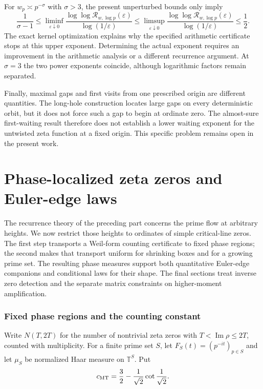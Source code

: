 \documentclass[11pt,letterpaper]{article}
\theoremstyle{definition}
\theoremstyle{remark}
\newcommand{\T}{\mathbb T}
\newcommand{\eps}{\varepsilon}
\renewcommand{\Im}{\operatorname{Im}}
\newcommand{\1}{\mathbf 1}
\begin{document}
For $w_p\asymp p^{-\sigma}$ with $\sigma>3$, the present
unperturbed bounds only imply
\[
 \frac1{\sigma-1}\le
 \liminf_{\eps\downarrow0}
 \frac{\log\log\mathcal R_{w,\log p}(\eps)}{\log(1/\eps)}
 \le
 \limsup_{\eps\downarrow0}
 \frac{\log\log\mathcal R_{w,\log p}(\eps)}{\log(1/\eps)}
 \le\frac12.
\]
The exact kernel optimization explains why the specified arithmetic
certificate stops at this upper exponent. Determining the actual
exponent requires an improvement in the arithmetic analysis or a
different recurrence argument. At $\sigma=3$ the two power exponents
coincide, although logarithmic factors remain separated.

Finally, maximal gaps and first visits from one prescribed origin are
different quantities. The long-hole construction locates large gaps
on every deterministic orbit, but it does not force such a gap to
begin at ordinate zero. The almost-sure first-waiting result therefore
does not establish a lower waiting exponent for the untwisted zeta
function at a fixed origin. This specific problem remains open in the
present work.


\clearpage

\part{Phase-localized zeta zeros and Euler-edge laws}
\label{part:zeta-localization}The recurrence theory of the preceding part concerns the prime flow
at arbitrary heights. We now restrict those heights to ordinates of
simple critical-line zeros. The first step transports a Weil-form
counting certificate to fixed phase regions; the second makes that
transport uniform for shrinking boxes and for a growing prime set.
The resulting phase measures support both quantitative Euler-edge
companions and conditional laws for their shape. The final sections
treat inverse zero detection and the separate matrix constraints on
higher-moment amplification.

\section{Fixed phase regions and the counting constant}

Write $N(T,2T)$ for the number of nontrivial zeta zeros with
$T<\Im\rho\le2T$, counted with multiplicity. For a finite prime set
$S$, let $F_S(t)=(p^{-it})_{p\in S}$ and let $\mu_S$ be normalized
Haar measure on $\T^S$. Put
\[
 c_{\rm MT}=\frac32-\frac1{\sqrt2}\cot\frac1{\sqrt2}.
\]
\end{document}
